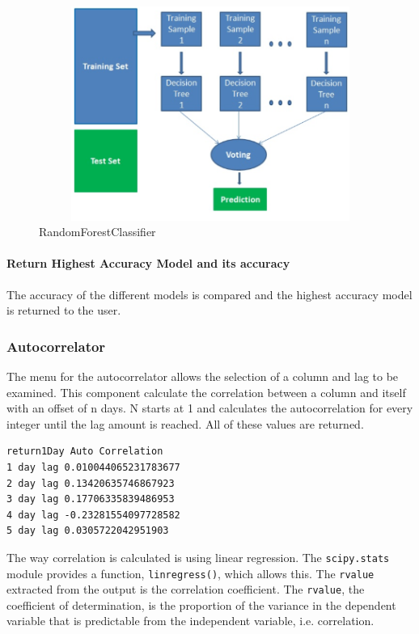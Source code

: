 \begin{itemize}
\begin{figure}[h!]
        \centering
        \includegraphics[width=15cm,height=7cm,keepaspectratio]{implementation/randomForest.png}
        \caption{RandomForestClassifier}
        \label{fig:randomForest}
    \end{figure}
\end{itemize}

\paragraph{Return Highest Accuracy Model and its accuracy}

The accuracy of the different models is compared and the highest accuracy model is returned to the user.

\subsubsection{Autocorrelator}

The menu for the autocorrelator allows the selection of a column and lag to be examined. This component calculate the correlation between a column and itself with an offset of n days. N starts at 1 and calculates the autocorrelation for every integer until the lag amount is reached. All of these values are returned.

\begin{lstlisting}[caption=Example AutoCorrelator Output when lag = 5 for return1Day column]
return1Day Auto Correlation
1 day lag 0.010044065231783677
2 day lag 0.13420635746867923
3 day lag 0.17706335839486953
4 day lag -0.23281554097728582
5 day lag 0.0305722042951903
\end{lstlisting}

The way correlation is calculated is using linear regression. The \verb|scipy.stats| module provides a function, \verb|linregress()|, which allows this. The \verb|rvalue| extracted from the output is the correlation coefficient. The \verb|rvalue|, the coefficient of determination, is the proportion of the variance in the dependent variable that is predictable from the independent variable, i.e. correlation.


